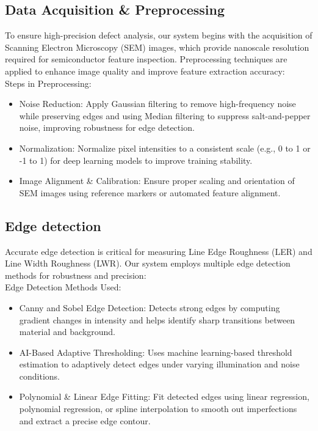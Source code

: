 \documentclass[12pt,oneside,letterpaper,english]{article}
\begin{document}
\subsection{Data Acquisition \& Preprocessing}
To ensure high-precision defect analysis, our system begins with the acquisition of Scanning Electron Microscopy (SEM) images, which provide nanoscale resolution required for semiconductor feature inspection. Preprocessing techniques are applied to enhance image quality and improve feature extraction accuracy:\\

Steps in Preprocessing:
\begin{itemize}
	\item Noise Reduction: Apply Gaussian filtering to remove high-frequency noise while preserving edges and using Median filtering to suppress salt-and-pepper noise, improving robustness for edge detection.
	
	\item Normalization: Normalize pixel intensities to a consistent scale (e.g., 0 to 1 or -1 to 1) for deep learning models to improve training stability.
	
	\item Image Alignment \& Calibration: Ensure proper scaling and orientation of SEM images using reference markers or automated feature alignment.
\end{itemize}

\subsection{Edge detection}
Accurate edge detection is critical for measuring Line Edge Roughness (LER) and Line Width Roughness (LWR). Our system employs multiple edge detection methods for robustness and precision:\\

Edge Detection Methods Used:

\begin{itemize}
	\item Canny and Sobel Edge Detection: Detects strong edges by computing gradient changes in intensity and helps identify sharp transitions between material and background.
	
	\item AI-Based Adaptive Thresholding: Uses machine learning-based threshold estimation to adaptively detect edges under varying illumination and noise conditions.
	
	\item Polynomial \& Linear Edge Fitting: Fit detected edges using linear regression, polynomial regression, or spline interpolation to smooth out imperfections and extract a precise edge contour.
	
\end{itemize}
\end{document}
